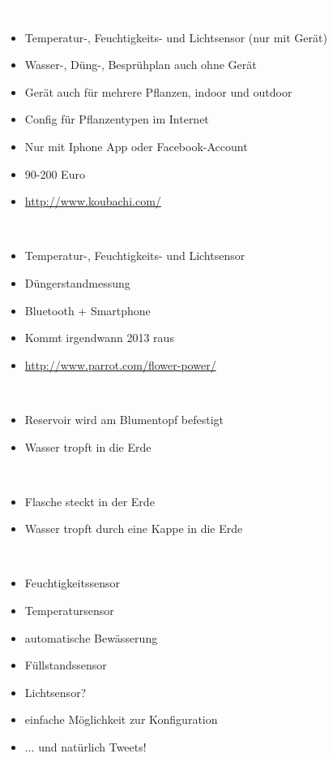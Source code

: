 \documentclass[bigger]{beamer}
\newcommand{\topic}[1]{{\huge{\textcolor{white}{\textbf{#1}}}}}
\begin{document}
\begin{frame}{\topic{Koubachi}}
	\begin{itemize}
		\item Temperatur-, Feuchtigkeits- und Lichtsensor (nur mit Gerät)
		\item Wasser-, Düng-, Besprühplan auch ohne Gerät
		\item Gerät auch für mehrere Pflanzen, indoor und outdoor
		\item Config für Pflanzentypen im Internet
		\item Nur mit Iphone App oder Facebook-Account
		\item 90-200 Euro
		\item \url{http://www.koubachi.com/}
	\end{itemize}
\end{frame}

\begin{frame}{\topic{Parrot Flower Power}}
	\begin{itemize}
		\item Temperatur-, Feuchtigkeits- und Lichtsensor
		\item Düngerstandmessung
		\item Bluetooth + Smartphone
		\item Kommt irgendwann 2013 raus
		\item\url{http://www.parrot.com/flower-power/}
	\end{itemize}
\end{frame}

\begin{frame}{\topic{Plant irrigation system}}
	\begin{itemize}
		\item Reservoir wird am Blumentopf befestigt
		\item Wasser tropft in die Erde
	\end{itemize}
\end{frame}

\begin{frame}{\topic{Plant irrigation device}}
	\begin{itemize}
		\item Flasche steckt in der Erde
		\item Wasser tropft durch eine Kappe in die Erde
	\end{itemize}
\end{frame}
\begin{frame}{\topic{The "planned" guard}}
	\begin{itemize}
		\item Feuchtigkeitssensor
		\item Temperatursensor
		\item automatische Bewässerung
		\item Füllstandssensor
		\item Lichtsensor?
		\item einfache Möglichkeit zur Konfiguration
		\item ... und natürlich Tweets!
	\end{itemize}
\end{frame}
\end{document}
